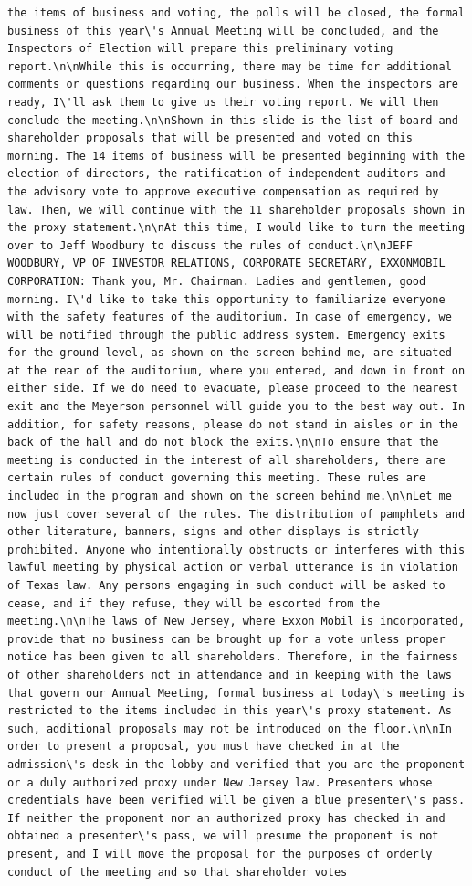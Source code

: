 \documentclass[
  letterpaper,
  DIV=11,
  numbers=noendperiod]{scrreprt}
\begin{document}
\begin{verbatim}
the items of business and voting, the polls will be closed, the formal business of this year\'s Annual Meeting will be concluded, and the Inspectors of Election will prepare this preliminary voting report.\n\nWhile this is occurring, there may be time for additional comments or questions regarding our business. When the inspectors are ready, I\'ll ask them to give us their voting report. We will then conclude the meeting.\n\nShown in this slide is the list of board and shareholder proposals that will be presented and voted on this morning. The 14 items of business will be presented beginning with the election of directors, the ratification of independent auditors and the advisory vote to approve executive compensation as required by law. Then, we will continue with the 11 shareholder proposals shown in the proxy statement.\n\nAt this time, I would like to turn the meeting over to Jeff Woodbury to discuss the rules of conduct.\n\nJEFF WOODBURY, VP OF INVESTOR RELATIONS, CORPORATE SECRETARY, EXXONMOBIL CORPORATION: Thank you, Mr. Chairman. Ladies and gentlemen, good morning. I\'d like to take this opportunity to familiarize everyone with the safety features of the auditorium. In case of emergency, we will be notified through the public address system. Emergency exits for the ground level, as shown on the screen behind me, are situated at the rear of the auditorium, where you entered, and down in front on either side. If we do need to evacuate, please proceed to the nearest exit and the Meyerson personnel will guide you to the best way out. In addition, for safety reasons, please do not stand in aisles or in the back of the hall and do not block the exits.\n\nTo ensure that the meeting is conducted in the interest of all shareholders, there are certain rules of conduct governing this meeting. These rules are included in the program and shown on the screen behind me.\n\nLet me now just cover several of the rules. The distribution of pamphlets and other literature, banners, signs and other displays is strictly prohibited. Anyone who intentionally obstructs or interferes with this lawful meeting by physical action or verbal utterance is in violation of Texas law. Any persons engaging in such conduct will be asked to cease, and if they refuse, they will be escorted from the meeting.\n\nThe laws of New Jersey, where Exxon Mobil is incorporated, provide that no business can be brought up for a vote unless proper notice has been given to all shareholders. Therefore, in the fairness of other shareholders not in attendance and in keeping with the laws that govern our Annual Meeting, formal business at today\'s meeting is restricted to the items included in this year\'s proxy statement. As such, additional proposals may not be introduced on the floor.\n\nIn order to present a proposal, you must have checked in at the admission\'s desk in the lobby and verified that you are the proponent or a duly authorized proxy under New Jersey law. Presenters whose credentials have been verified will be given a blue presenter\'s pass. If neither the proponent nor an authorized proxy has checked in and obtained a presenter\'s pass, we will presume the proponent is not present, and I will move the proposal for the purposes of orderly conduct of the meeting and so that shareholder votes 
\end{verbatim}
\end{document}

